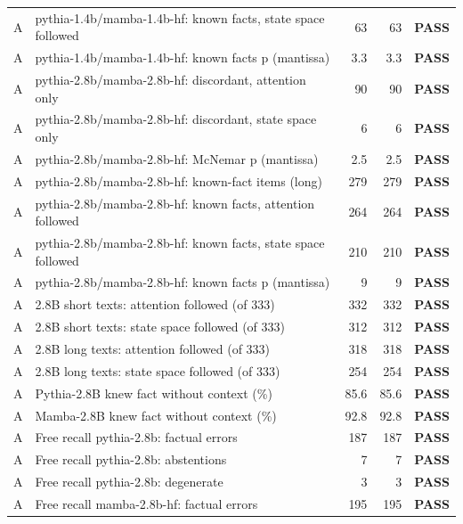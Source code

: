 {\begin{longtable}{@{}cp{8.2cm}rrc@{}}
A & pythia-1.4b/mamba-1.4b-hf: known facts, state space followed & 63 & 63 & \textcolor{okgreen}{\textbf{PASS}} \\
A & pythia-1.4b/mamba-1.4b-hf: known facts p (mantissa) & 3.3 & 3.3 & \textcolor{okgreen}{\textbf{PASS}} \\
A & pythia-2.8b/mamba-2.8b-hf: discordant, attention only & 90 & 90 & \textcolor{okgreen}{\textbf{PASS}} \\
A & pythia-2.8b/mamba-2.8b-hf: discordant, state space only & 6 & 6 & \textcolor{okgreen}{\textbf{PASS}} \\
A & pythia-2.8b/mamba-2.8b-hf: McNemar p (mantissa) & 2.5 & 2.5 & \textcolor{okgreen}{\textbf{PASS}} \\
A & pythia-2.8b/mamba-2.8b-hf: known-fact items (long) & 279 & 279 & \textcolor{okgreen}{\textbf{PASS}} \\
A & pythia-2.8b/mamba-2.8b-hf: known facts, attention followed & 264 & 264 & \textcolor{okgreen}{\textbf{PASS}} \\
A & pythia-2.8b/mamba-2.8b-hf: known facts, state space followed & 210 & 210 & \textcolor{okgreen}{\textbf{PASS}} \\
A & pythia-2.8b/mamba-2.8b-hf: known facts p (mantissa) & 9 & 9 & \textcolor{okgreen}{\textbf{PASS}} \\
A & 2.8B short texts: attention followed (of 333) & 332 & 332 & \textcolor{okgreen}{\textbf{PASS}} \\
A & 2.8B short texts: state space followed (of 333) & 312 & 312 & \textcolor{okgreen}{\textbf{PASS}} \\
A & 2.8B long texts: attention followed (of 333) & 318 & 318 & \textcolor{okgreen}{\textbf{PASS}} \\
A & 2.8B long texts: state space followed (of 333) & 254 & 254 & \textcolor{okgreen}{\textbf{PASS}} \\
A & Pythia-2.8B knew fact without context (\%) & 85.6 & 85.6 & \textcolor{okgreen}{\textbf{PASS}} \\
A & Mamba-2.8B knew fact without context (\%) & 92.8 & 92.8 & \textcolor{okgreen}{\textbf{PASS}} \\
A & Free recall pythia-2.8b: factual errors & 187 & 187 & \textcolor{okgreen}{\textbf{PASS}} \\
A & Free recall pythia-2.8b: abstentions & 7 & 7 & \textcolor{okgreen}{\textbf{PASS}} \\
A & Free recall pythia-2.8b: degenerate & 3 & 3 & \textcolor{okgreen}{\textbf{PASS}} \\
A & Free recall mamba-2.8b-hf: factual errors & 195 & 195 & \textcolor{okgreen}{\textbf{PASS}} \\

\end{longtable}}
